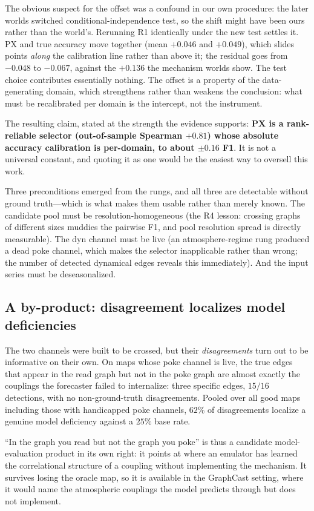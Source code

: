 The obvious suspect for the offset was a confound in our own procedure: the later
worlds switched conditional-independence test, so the shift might have been ours
rather than the world's. Rerunning R1 identically under the new test settles it.
PX and true accuracy move together (mean $+0.046$ and $+0.049$), which slides
points \emph{along} the calibration line rather than above it; the residual goes
from $-0.048$ to $-0.067$, against the $+0.136$ the mechanism worlds show. The
test choice contributes essentially nothing. The offset is a property of the
data-generating domain, which strengthens rather than weakens the conclusion: what
must be recalibrated per domain is the intercept, not the instrument.

The resulting claim, stated at the strength the evidence supports: \textbf{PX is a
rank-reliable selector (out-of-sample Spearman $+0.81$) whose absolute
accuracy calibration is per-domain, to about $\pm 0.16$ F1}. It is not a universal
constant, and quoting it as one would be the easiest way to oversell this work.

Three preconditions emerged from the rungs, and all three are detectable without
ground truth---which is what makes them usable rather than merely known. The
candidate pool must be resolution-homogeneous (the R4 lesson: crossing graphs of
different sizes muddies the pairwise F1, and pool resolution spread is directly
measurable). The dyn channel must be live (an atmosphere-regime rung produced a
dead poke channel, which makes the selector inapplicable rather than wrong; the
number of detected dynamical edges reveals this immediately). And the input series
must be deseasonalized.

\subsection{A by-product: disagreement localizes model deficiencies}

The two channels were built to be crossed, but their \emph{disagreements} turn out
to be informative on their own. On maps whose poke channel is live, the true edges
that appear in the read graph but not in the poke graph are almost exactly the
couplings the forecaster failed to internalize: three specific edges, $15/16$
detections, with no non-ground-truth disagreements. Pooled over all good maps
including those with handicapped poke channels, $62\%$ of disagreements localize a
genuine model deficiency against a $25\%$ base rate.

``In the graph you read but not the graph you poke'' is thus a candidate
model-evaluation product in its own right: it points at where an emulator has
learned the correlational structure of a coupling without implementing the
mechanism. It survives losing the oracle map, so it is available in the GraphCast
setting, where it would name the atmospheric couplings the model predicts through
but does not implement.
